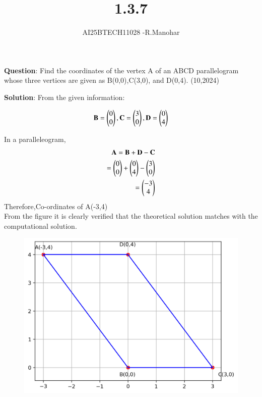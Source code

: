 \documentclass[journal,12pt,onecolumn]{IEEEtran}
\title{1.3.7}
\author{AI25BTECH11028 -R.Manohar}
\begin{document}
\maketitle
{\let\newpage\relax\maketitle}
\renewcommand{\thefigure}{\theenumi}\renewcommand{\thetable}{\theenumi}
 \bigskip

\textbf{Question}:
\noindent Find the coordinates of the  vertex A of an ABCD parallelogram whose three vertices are given as B(0,0),C(3,0), and D(0,4).
\hfill{(10,2024)}

\textbf{Solution}: From the given information:

\begin{align}
\mathbf{B} = \begin{pmatrix}0\\0\end{pmatrix}, \mathbf{C} = \begin{pmatrix}3\\0\end{pmatrix}, \mathbf{D} = \begin{pmatrix}0\\4\end{pmatrix}
\end{align}

In a paralleleogram,
\begin{align}
\mathbf{A} = \mathbf{B} + \mathbf{D} - \mathbf{C}\\
= \begin{pmatrix}0\\0\end{pmatrix} + \begin{pmatrix}0\\4\end{pmatrix} - \begin{pmatrix}3\\0\end{pmatrix}\\
= \begin{pmatrix}-3\\4\end{pmatrix}
\end{align}
Therefore,Co-ordinates of A(-3,4)\\

From the figure it is clearly verified that the theoretical solution matches with the computational solution.\\
\begin{figure}[h!]
    \centering
    \includegraphics[height=0.5\textheight, keepaspectratio]{figs/figure_1.png}
    \label{figure_1}
\end{figure}
\end{document}
